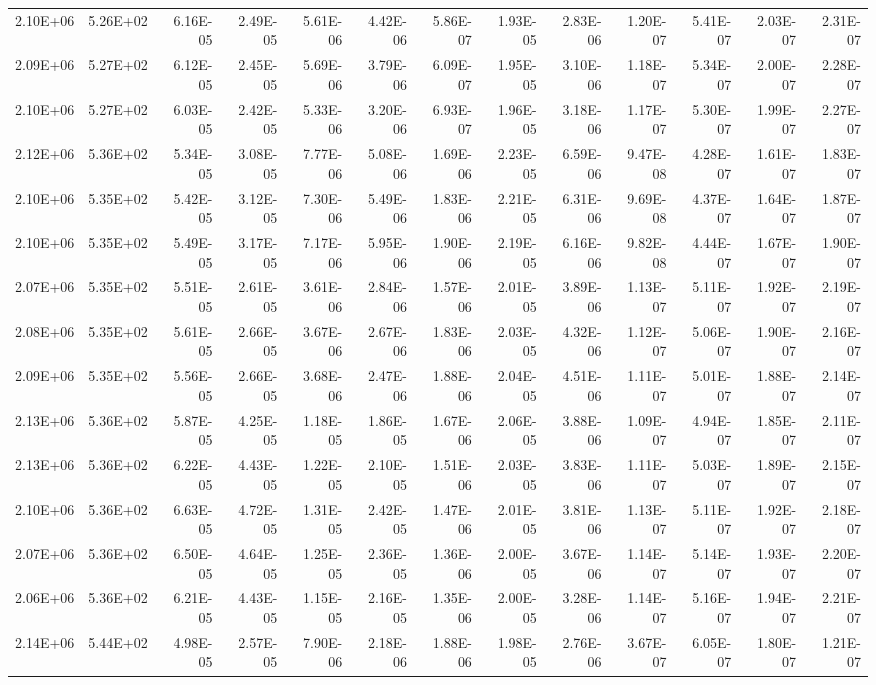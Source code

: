 \begin{tabular}{rrrrrrrrrrrrr}
2.10E+06 & 5.26E+02 & 6.16E-05 & 2.49E-05 & 5.61E-06 & 4.42E-06 & 5.86E-07 & 1.93E-05 & 2.83E-06 & 1.20E-07 & 5.41E-07 & 2.03E-07 & 2.31E-07 \\
2.09E+06 & 5.27E+02 & 6.12E-05 & 2.45E-05 & 5.69E-06 & 3.79E-06 & 6.09E-07 & 1.95E-05 & 3.10E-06 & 1.18E-07 & 5.34E-07 & 2.00E-07 & 2.28E-07 \\
2.10E+06 & 5.27E+02 & 6.03E-05 & 2.42E-05 & 5.33E-06 & 3.20E-06 & 6.93E-07 & 1.96E-05 & 3.18E-06 & 1.17E-07 & 5.30E-07 & 1.99E-07 & 2.27E-07 \\
2.12E+06 & 5.36E+02 & 5.34E-05 & 3.08E-05 & 7.77E-06 & 5.08E-06 & 1.69E-06 & 2.23E-05 & 6.59E-06 & 9.47E-08 & 4.28E-07 & 1.61E-07 & 1.83E-07 \\
2.10E+06 & 5.35E+02 & 5.42E-05 & 3.12E-05 & 7.30E-06 & 5.49E-06 & 1.83E-06 & 2.21E-05 & 6.31E-06 & 9.69E-08 & 4.37E-07 & 1.64E-07 & 1.87E-07 \\
2.10E+06 & 5.35E+02 & 5.49E-05 & 3.17E-05 & 7.17E-06 & 5.95E-06 & 1.90E-06 & 2.19E-05 & 6.16E-06 & 9.82E-08 & 4.44E-07 & 1.67E-07 & 1.90E-07 \\
2.07E+06 & 5.35E+02 & 5.51E-05 & 2.61E-05 & 3.61E-06 & 2.84E-06 & 1.57E-06 & 2.01E-05 & 3.89E-06 & 1.13E-07 & 5.11E-07 & 1.92E-07 & 2.19E-07 \\
2.08E+06 & 5.35E+02 & 5.61E-05 & 2.66E-05 & 3.67E-06 & 2.67E-06 & 1.83E-06 & 2.03E-05 & 4.32E-06 & 1.12E-07 & 5.06E-07 & 1.90E-07 & 2.16E-07 \\
2.09E+06 & 5.35E+02 & 5.56E-05 & 2.66E-05 & 3.68E-06 & 2.47E-06 & 1.88E-06 & 2.04E-05 & 4.51E-06 & 1.11E-07 & 5.01E-07 & 1.88E-07 & 2.14E-07 \\
2.13E+06 & 5.36E+02 & 5.87E-05 & 4.25E-05 & 1.18E-05 & 1.86E-05 & 1.67E-06 & 2.06E-05 & 3.88E-06 & 1.09E-07 & 4.94E-07 & 1.85E-07 & 2.11E-07 \\
2.13E+06 & 5.36E+02 & 6.22E-05 & 4.43E-05 & 1.22E-05 & 2.10E-05 & 1.51E-06 & 2.03E-05 & 3.83E-06 & 1.11E-07 & 5.03E-07 & 1.89E-07 & 2.15E-07 \\
2.10E+06 & 5.36E+02 & 6.63E-05 & 4.72E-05 & 1.31E-05 & 2.42E-05 & 1.47E-06 & 2.01E-05 & 3.81E-06 & 1.13E-07 & 5.11E-07 & 1.92E-07 & 2.18E-07 \\
2.07E+06 & 5.36E+02 & 6.50E-05 & 4.64E-05 & 1.25E-05 & 2.36E-05 & 1.36E-06 & 2.00E-05 & 3.67E-06 & 1.14E-07 & 5.14E-07 & 1.93E-07 & 2.20E-07 \\
2.06E+06 & 5.36E+02 & 6.21E-05 & 4.43E-05 & 1.15E-05 & 2.16E-05 & 1.35E-06 & 2.00E-05 & 3.28E-06 & 1.14E-07 & 5.16E-07 & 1.94E-07 & 2.21E-07 \\
2.14E+06 & 5.44E+02 & 4.98E-05 & 2.57E-05 & 7.90E-06 & 2.18E-06 & 1.88E-06 & 1.98E-05 & 2.76E-06 & 3.67E-07 & 6.05E-07 & 1.80E-07 & 1.21E-07 \\

\end{tabular}
